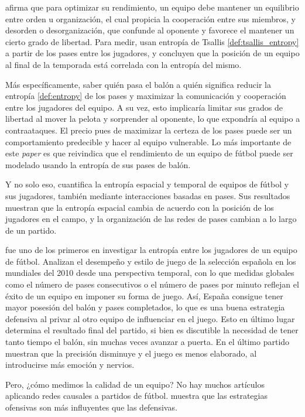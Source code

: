 \cite{entropy-analysis} afirma que para optimizar su rendimiento, un 
equipo debe mantener un equilibrio entre orden u organización, el cual 
propicia la cooperación entre sus miembros, y desorden o desorganización, que confunde 
al oponente y favorece el mantener un cierto grado de libertad. Para medir, usan entropía de 
Tsallis \ref{def:tsallis_entropy} a partir de los pases entre los jugadores, y concluyen que la posición de un equipo 
al final de la temporada está correlada con la entropía del mismo. 

Más específicamente, saber quién pasa el balón a quién significa reducir la entropía \ref{def:entropy} de los pases y maximizar 
la comunicación y cooperación entre los jugadores del equipo. A su vez, esto implicaría limitar sus 
grados de libertad al mover la pelota y sorprender al oponente, lo que expondría al equipo a contraataques. El precio 
pues de maximizar la certeza de los pases puede ser un comportamiento predecible y hacer al equipo vulnerable. Lo más importante 
de este \textit{paper} es que reivindica que el rendimiento de un equipo de fútbol puede 
ser modelado usando la entropía de sus pases de balón.

Y no solo eso, \cite{spatial-and-temporal-entropies} cuantifica la entropía espacial y temporal de 
equipos de fútbol y sus jugadores, también mediante interacciones basadas en pases. Sus resultados 
muestran que la entropía espacial cambia de acuerdo con la posición de los jugadores en el campo, y la 
organización de las redes de pases cambian a lo largo de un partido. 

\cite{network-analysis} fue uno de los primeros en investigar la entropía entre los jugadores de un equipo de 
fútbol. Analizan el desempeño y estilo de juego de la selección española en los mundiales del 2010 desde una 
perspectiva temporal, con lo que medidas globales como el número de pases consecutivos o el número de 
pases por minuto reflejan el éxito de un equipo en imponer su forma de juego.
Así, España consigue tener mayor posesión del balón y pases completados, lo que es una buena estrategia defensiva 
al privar al otro equipo de influenciar en el juego. Esto en último lugar determina el resultado final del partido, 
si bien es discutible la necesidad de tener tanto tiempo el balón, sin muchas veces avanzar a puerta. En el 
último partido muestran que la precisión disminuye y el juego es menos elaborado, al introducirse 
más emoción y nervios.

Pero, ¿cómo medimos la calidad de un equipo? No hay muchos artículos aplicando redes causales a partidos de 
fútbol. \cite{cerqueira} muestra que las estrategias ofensivas son más influyentes que las defensivas.



 